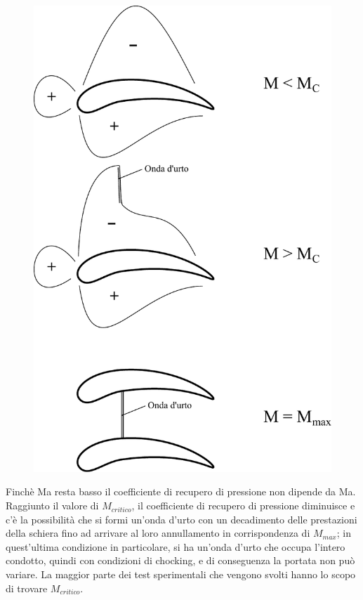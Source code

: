 \begin{figure}[h!]
\begin{minipage}{.4\textwidth}
  \includegraphics[width=.95\linewidth]{fig/FuoriProgMach.pdf}
  \label{fig:FuoriProgMach}
\end{minipage}
\end{figure}
Finchè Ma resta basso il coefficiente di recupero di pressione non dipende da Ma. Raggiunto il valore di $M_{critico}$, il coefficiente di recupero di pressione diminuisce e c'è la possibilità che si formi un'onda d'urto con un decadimento delle prestazioni della schiera fino ad arrivare al loro annullamento in corrispondenza di $M_{max}$; in quest'ultima condizione in particolare, si ha un'onda d'urto che occupa l'intero condotto, quindi con condizioni di chocking, e di conseguenza la portata non può variare. La maggior parte dei test sperimentali che vengono svolti hanno lo scopo di trovare $M_{critico}$.
